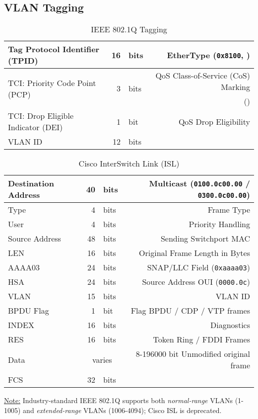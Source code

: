 \documentclass[12pt]{article}
\newif\ifcolor											%
\newcommand{\note}[1]{\ifcolor \colorbox{#1}{Note:}\else \underline{Note:}\fi}
\newcommand{\mc}[3]{\multicolumn{#1}{#2}{#3}}
\newcommand{\mr}[2]{\multirow{#1}{*}{#2}}
\begin{document}
	\subsection{VLAN Tagging \label{subsec:VLAN TAGGING}}
	\begin{table}[H]
	\centering
	\caption{IEEE 802.1Q Tagging \label{tab:802.1Q}}
	\begin{tabular}{| l | r @{ } l | r |}\hline
	Tag Protocol Identifier (TPID)			& 16		& bits		& EtherType (\texttt{0x8100}, \Cref{tab:ETHERTYPE})\\\hline
	\mr{2}{TCI: Priority Code Point (PCP)}	& \mr{2}{3}	& \mr{2}{bits}	& QoS Class-of-Service (CoS) Marking\\
								&		&			& (\Cref{sec:QOS})\\\hline
	TCI: Drop Eligible Indicator (DEI)		& 1		& bit 			& QoS Drop Eligibility\\\hline
	VLAN ID 						& 12		& bits		&\\\hline
	\end{tabular}\end{table}

	\begin{table}[H]
	\centering
	\caption{Cisco InterSwitch Link (ISL) \label{tab:CISCO ISL}}
	\begin{tabular}{| l | r @{ } l | r |}\hline
	Destination Address	& 40	& bits		& Multicast (\texttt{0100.0c00.00} / \texttt{0300.0c00.00})\\\hline
	Type				& 4	& bits		& Frame Type\\\hline
	User				& 4	& bits		& Priority Handling\\\hline
	Source Address		& 48	& bits		& Sending Switchport MAC\\\hline
	LEN				& 16	& bits		& Original Frame Length in Bytes\\\hline
	AAAA03			& 24	& bits		& SNAP/LLC Field (\texttt{0xaaaa03})\\\hline
	HSA				& 24	& bits		& Source Address OUI (\texttt{0000.0c})\\\hline
	VLAN				& 15	& bits		& VLAN ID\\\hline
	BPDU Flag			& 1	& bit 			& Flag BPDU / CDP / VTP frames\\\hline
	INDEX			& 16	& bits		& Diagnostics\\\hline
	RES				& 16	& bits		& Token Ring / FDDI Frames\\\hline
	Data				& \mc{2}{c|}{varies}	& 8-196000 bit Unmodified original frame\\\hline
	FCS				& 32	& bits		&\\\hline
	\end{tabular}\end{table}
	\note{Goldenrod} Industry-standard IEEE 802.1Q supports both \textit{normal-range} VLANs (1-1005) and \textit{extended-range} VLANs (1006-4094); Cisco ISL is deprecated.
\end{document}
